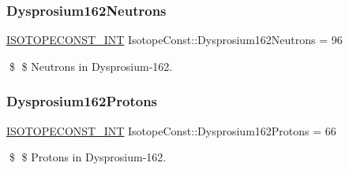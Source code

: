 \subsubsection{\texorpdfstring{Dysprosium162\+Neutrons}{Dysprosium162Neutrons}}
{\footnotesize\ttfamily \mbox{\hyperlink{group___isotope_const-_macros_ga5f18360b3e99483a35c32d789e62621c}{I\+S\+O\+T\+O\+P\+E\+C\+O\+N\+S\+T\+\_\+\+I\+NT}} Isotope\+Const\+::\+Dysprosium162\+Neutrons = 96}

\$ \$ Neutrons in Dysprosium-\/162. \mbox{\label{group___isotope_const-_dysprosium-_dy162_ga507af844f796a9606ee172f5047881e5}} 
\subsubsection{\texorpdfstring{Dysprosium162\+Protons}{Dysprosium162Protons}}
{\footnotesize\ttfamily \mbox{\hyperlink{group___isotope_const-_macros_ga5f18360b3e99483a35c32d789e62621c}{I\+S\+O\+T\+O\+P\+E\+C\+O\+N\+S\+T\+\_\+\+I\+NT}} Isotope\+Const\+::\+Dysprosium162\+Protons = 66}

\$ \$ Protons in Dysprosium-\/162. 